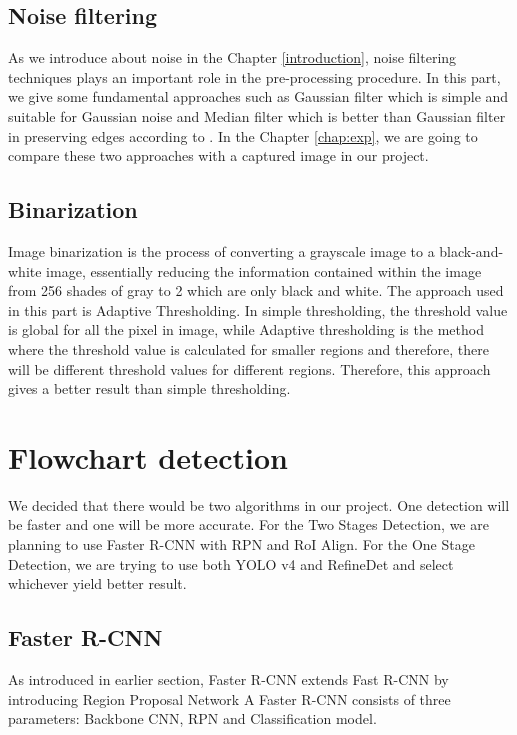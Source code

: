 \subsection{Noise filtering}
As we introduce about noise in the Chapter \ref{introduction}, noise filtering techniques plays an important role in the pre-processing procedure. In this part, we give some fundamental approaches such as Gaussian filter which is simple and suitable for Gaussian noise and Median filter which is better than Gaussian filter in preserving edges according to \cite{56}. In the Chapter \ref{chap:exp}, we are going to compare these two approaches with a captured image in our project.

\subsection{Binarization}
Image binarization is the process of converting a grayscale image to a black-and-white image, essentially reducing the information contained within the image from 256 shades of gray to 2 which are only black and white. The approach used in this part is Adaptive Thresholding. In simple thresholding, the threshold value is global for all the pixel in image, while Adaptive thresholding is the method where the threshold value is calculated for smaller regions and therefore, there will be different threshold values for different regions. Therefore, this approach gives a better result than simple thresholding.

\section{Flowchart detection}
We decided that there would be two algorithms in our project. One detection will be faster and one will be more accurate. For the Two Stages Detection, we are planning to use Faster R-CNN with RPN and RoI Align. For the One Stage Detection, we are trying to use both YOLO v4 and RefineDet and select whichever yield better result.
\subsection{Faster R-CNN}
As introduced in earlier section, Faster R-CNN extends Fast R-CNN by introducing Region Proposal Network
A Faster R-CNN consists of three parameters: Backbone CNN, RPN and Classification model.
